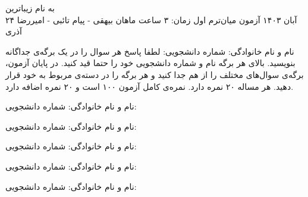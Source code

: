 
\usepackage{assets/template}
\newcommand{\hidesolutions}{}


{\centering به نام زیباترین}\\

	\header
		{۲۴ آبان ۱۴۰۳}
		{آزمون میان‌ترم اول}
		{زمان: ۳ ساعت}
		{ماهان بیهقی - پیام تائبی - امیررضا آذری}{}
	
\vspace{-3mm}
نام و نام خانوادگی: \hspace{8cm} شماره دانشجویی:
\hline
\vspace{2mm}
لطفا پاسخ هر سوال را در یک برگه‌ی جداگانه بنویسید. بالای هر برگه نام و شماره‌ دانشجویی خود را حتما قید کنید. در پایان آزمون، برگه‌ی سوال‌های مختلف را از هم جدا کنید و هر برگه را در دسته‌ی مربوط به خود قرار دهید.
هر مساله ۲۰ نمره دارد. نمره‌ی کامل آزمون ۱۰۰ است و  ۲۰ نمره اضافه دارد.

\vspace{0.5cm}

\pagebreak
\hline
نام و نام خانوادگی: \hspace{8cm} شماره دانشجویی:
\hline
\vspace{0.5cm}

\pagebreak
\hline
نام و نام خانوادگی: \hspace{8cm} شماره دانشجویی:
\hline
\vspace{0.5cm}

\pagebreak
\hline
نام و نام خانوادگی: \hspace{8cm} شماره دانشجویی:
\hline
\vspace{0.5cm}

\pagebreak
\hline
نام و نام خانوادگی: \hspace{8cm} شماره دانشجویی:
\hline
\vspace{0.5cm}

\pagebreak
\hline
نام و نام خانوادگی: \hspace{8cm} شماره دانشجویی:
\hline
\vspace{0.5cm}


